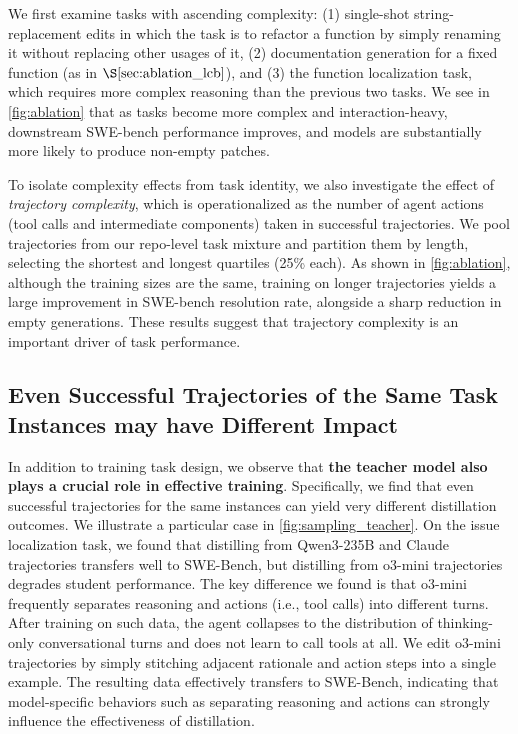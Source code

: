 \documentclass{article}
\theoremstyle{plain}
\theoremstyle{definition}
\theoremstyle{remark}
\begin{document}
We first examine tasks with ascending complexity: (1) single-shot string-replacement edits in which the task is to refactor a function by simply renaming it without replacing other usages of it, (2) documentation generation for a fixed function (as in $\S\ref{sec:ablation_lcb}$), and (3) the function localization task, which requires more complex reasoning than the previous two tasks.
We see in \autoref{fig:ablation} that as tasks become more complex and interaction-heavy, downstream SWE-bench performance improves, and models are substantially more likely to produce non-empty patches.


To isolate complexity effects from task identity, we also investigate the effect of \emph{trajectory complexity}, which is operationalized as the number of agent actions (tool calls and intermediate components) taken in successful trajectories.
We pool trajectories from our repo-level task mixture and partition them by length, selecting the shortest and longest quartiles (25\% each). 
As shown in \autoref{fig:ablation}, although the training sizes are the same, training on longer trajectories yields a large improvement in SWE-bench resolution rate, alongside a sharp reduction in empty generations. These results suggest that trajectory complexity is an important driver of task performance.



\subsection{Even Successful Trajectories of the Same Task Instances may have Different Impact}
In addition to training task design, we observe that \textbf{the teacher model also plays a crucial role in effective training}.
Specifically, we find that even successful trajectories for the same instances can yield very different distillation outcomes.
We illustrate a particular case in \autoref{fig:sampling_teacher}. 
On the issue localization task, we found that distilling from Qwen3-235B and Claude trajectories transfers well to SWE-Bench, but distilling from o3-mini trajectories degrades student performance. 
The key difference we found is that o3-mini frequently separates reasoning and actions (i.e., tool calls) into different turns.
After training on such data, the agent collapses to the distribution of thinking-only conversational turns and does not learn to call tools at all.
We edit o3-mini trajectories by simply stitching adjacent rationale and action steps into a single example. The resulting data effectively transfers to SWE-Bench, indicating that model-specific behaviors such as separating reasoning and actions can strongly influence the effectiveness of distillation.
\end{document}
